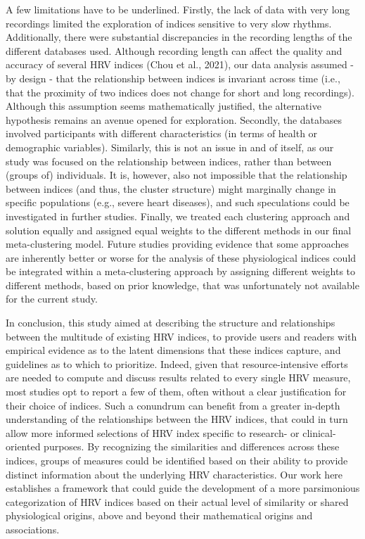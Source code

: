 \documentclass[
  english,
  jou,floatsintext]{apa6}
\begin{document}
A few limitations have to be underlined. Firstly, the lack of data with very long recordings limited the exploration of indices sensitive to very slow rhythms. Additionally, there were substantial discrepancies in the recording lengths of the different databases used. Although recording length can affect the quality and accuracy of several HRV indices (Chou et al., 2021), our data analysis assumed - by design - that the relationship between indices is invariant across time (i.e., that the proximity of two indices does not change for short and long recordings). Although this assumption seems mathematically justified, the alternative hypothesis remains an avenue opened for exploration. Secondly, the databases involved participants with different characteristics (in terms of health or demographic variables). Similarly, this is not an issue in and of itself, as our study was focused on the relationship between indices, rather than between (groups of) individuals. It is, however, also not impossible that the relationship between indices (and thus, the cluster structure) might marginally change in specific populations (e.g., severe heart diseases), and such speculations could be investigated in further studies. Finally, we treated each clustering approach and solution equally and assigned equal weights to the different methods in our final meta-clustering model. Future studies providing evidence that some approaches are inherently better or worse for the analysis of these physiological indices could be integrated within a meta-clustering approach by assigning different weights to different methods, based on prior knowledge, that was unfortunately not available for the current study.

In conclusion, this study aimed at describing the structure and relationships between the multitude of existing HRV indices, to provide users and readers with empirical evidence as to the latent dimensions that these indices capture, and guidelines as to which to prioritize. Indeed, given that resource-intensive efforts are needed to compute and discuss results related to every single HRV measure, most studies opt to report a few of them, often without a clear justification for their choice of indices. Such a conundrum can benefit from a greater in-depth understanding of the relationships between the HRV indices, that could in turn allow more informed selections of HRV index specific to research- or clinical-oriented purposes. By recognizing the similarities and differences across these indices, groups of measures could be identified based on their ability to provide distinct information about the underlying HRV characteristics. Our work here establishes a framework that could guide the development of a more parsimonious categorization of HRV indices based on their actual level of similarity or shared physiological origins, above and beyond their mathematical origins and associations.
\end{document}
